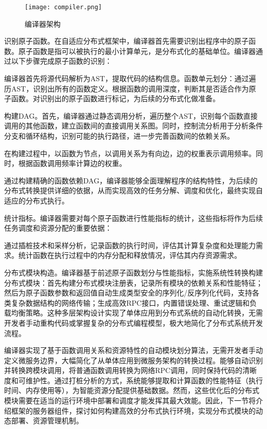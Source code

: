 \begin{figure}[ht]
    \centering
    \texttt{[image: compiler.png]}
    \caption{编译器架构}
    \label{fig:compiler}
\end{figure}


识别原子函数。在自适应分布式框架中，编译器首先需要识别出程序中的原子函数。原子函数是指可以被执行的最小计算单元，是分布式化的基础单位。编译器通过以下步骤完成原子函数的识别：

编译器首先将源代码解析为AST，提取代码的结构信息。函数单元划分：通过遍历AST，识别出所有的函数定义。根据函数的调用深度，判断其是否适合作为原子函数。对识别出的原子函数进行标记，为后续的分布式化做准备。

构建DAG。首先，编译器通过静态调用分析，遍历整个AST，识别每个函数直接调用的其他函数，建立函数间的直接调用关系图。同时，控制流分析用于分析条件分支和循环结构，识别可能的执行路径，进一步完善函数间的依赖关系。

在构建过程中，以函数为节点，以调用关系为有向边，边的权重表示调用频率。同时，根据函数调用频率计算边的权重。

通过构建精确的函数依赖DAG，编译器能够全面理解程序的结构特性，为后续的分布式转换提供详细的依据，从而实现高效的任务分解、调度和优化，最终实现自适应的分布式执行。

统计指标。编译器需要对每个原子函数进行性能指标的统计，这些指标将作为后续任务调度和资源分配的重要依据：

通过插桩技术和采样分析，记录函数的执行时间，评估其计算复杂度和处理能力需求。统计函数在执行过程中的内存分配和释放情况，评估其内存资源需求。

分布式模块构造。编译器基于前述原子函数划分与性能指标，实施系统性转换构建分布式模块：首先构建分布式模块注册表，记录所有模块的依赖关系和性能特征；然后为原子函数参数和返回值自动生成类型安全的序列化/反序列化代码，支持各类复杂数据结构的网络传输；生成高效RPC接口，内置错误处理、重试逻辑和负载均衡策略。这种多层架构设计实现了单体应用到分布式系统的自动化转换，无需开发者手动重构代码或掌握复杂的分布式编程模型，极大地简化了分布式系统开发流程。

编译器实现了基于函数调用关系和资源特性的自动模块划分算法，无需开发者手动定义微服务边界，大幅简化了从单体应用到微服务架构的转换过程。能够自动识别并转换跨模块调用，将普通函数调用转换为网络RPC调用，同时保持代码的清晰度和可维护性。通过打桩分析的方式，系统能够提取和计算函数的性能特征（执行时间、内存使用等），为智能资源分配提供基础数据。然而，这些优化后的分布式模块需要在适当的运行环境中部署和调度才能发挥其最大效能。因此，下一节将介绍框架的服务器组件，探讨如何构建高效的分布式执行环境，实现分布式模块的动态部署、资源管理机制。

